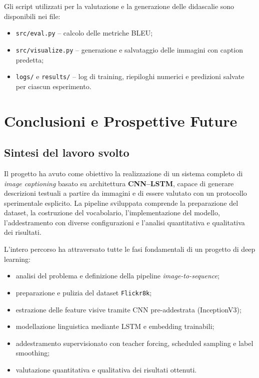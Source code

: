 \documentclass[11pt,a4paper]{report}
\newcommand{\dataset}{\texttt{Flickr8k}}
\begin{document}
\begin{tcolorbox}[title=Riferimento al codice]
Gli script utilizzati per la valutazione e la generazione delle didascalie sono disponibili nei file:
\begin{itemize}
  \item \texttt{src/eval.py} – calcolo delle metriche BLEU;
  \item \texttt{src/visualize.py} – generazione e salvataggio delle immagini con caption predetta;
  \item \texttt{logs/} e \texttt{results/} – log di training, riepiloghi numerici e predizioni salvate per ciascun esperimento.
\end{itemize}
\end{tcolorbox}

\chapter{Conclusioni e Prospettive Future}

\section{Sintesi del lavoro svolto}

Il progetto ha avuto come obiettivo la realizzazione di un sistema completo di \emph{image captioning} basato su architettura \textbf{CNN--LSTM}, capace di generare descrizioni testuali a partire da immagini e di essere valutato con un protocollo sperimentale esplicito. La pipeline sviluppata comprende la preparazione del dataset, la costruzione del vocabolario, l'implementazione del modello, l'addestramento con diverse configurazioni e l'analisi quantitativa e qualitativa dei risultati.

L’intero percorso ha attraversato tutte le fasi fondamentali di un progetto di deep learning:
\begin{itemize}
  \item analisi del problema e definizione della pipeline \emph{image-to-sequence};
  \item preparazione e pulizia del dataset \dataset{};
  \item estrazione delle feature visive tramite CNN pre-addestrata (InceptionV3);
  \item modellazione linguistica mediante LSTM e embedding trainabili;
  \item addestramento supervisionato con teacher forcing, scheduled sampling e label smoothing;
  \item valutazione quantitativa e qualitativa dei risultati ottenuti.
\end{itemize}
\end{document}
